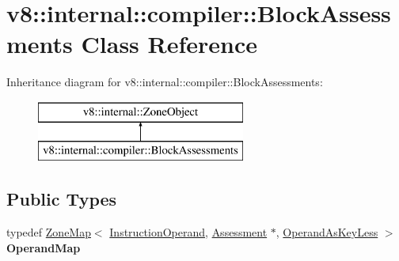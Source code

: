 \hypertarget{classv8_1_1internal_1_1compiler_1_1_block_assessments}{}\section{v8\+:\+:internal\+:\+:compiler\+:\+:Block\+Assessments Class Reference}
\label{classv8_1_1internal_1_1compiler_1_1_block_assessments}
Inheritance diagram for v8\+:\+:internal\+:\+:compiler\+:\+:Block\+Assessments\+:\begin{figure}[H]
\begin{center}
\leavevmode
\includegraphics[height=2.000000cm]{classv8_1_1internal_1_1compiler_1_1_block_assessments}
\end{center}
\end{figure}
\subsection*{Public Types}
\begin{DoxyCompactItemize}
\item 
typedef \hyperlink{classv8_1_1internal_1_1_zone_map}{Zone\+Map}$<$ \hyperlink{classv8_1_1internal_1_1compiler_1_1_instruction_operand}{Instruction\+Operand}, \hyperlink{classv8_1_1internal_1_1compiler_1_1_assessment}{Assessment} $\ast$, \hyperlink{structv8_1_1internal_1_1compiler_1_1_operand_as_key_less}{Operand\+As\+Key\+Less} $>$ {\bfseries Operand\+Map}\hypertarget{classv8_1_1internal_1_1compiler_1_1_block_assessments_aadb80ba282499ca7661203edf35956ba}{}\label{classv8_1_1internal_1_1compiler_1_1_block_assessments_aadb80ba282499ca7661203edf35956ba}

\end{DoxyCompactItemize}
